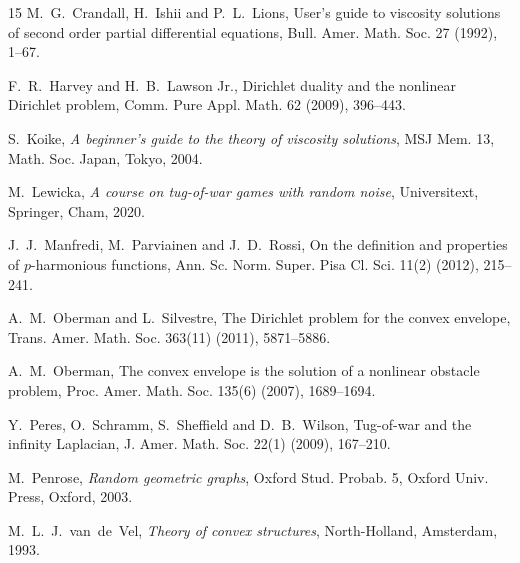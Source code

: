 \documentclass[11pt]{amsart}
\theoremstyle{definition}
\theoremstyle{remark}
\numberwithin{equation}{section}
\begin{document}
\begin{thebibliography}{15}
M.~G.~Crandall, H.~Ishii and P.~L.~Lions,
User's guide to viscosity solutions of second order partial differential equations,
Bull. Amer. Math. Soc. 27 (1992), 1--67.

F.~R.~Harvey and H.~B.~Lawson Jr.,
Dirichlet duality and the nonlinear Dirichlet problem,
Comm. Pure Appl. Math. 62 (2009), 396--443.
		
S.~Koike,
\textit{A beginner's guide to the theory of viscosity solutions},
MSJ Mem. 13, Math. Soc. Japan, Tokyo, 2004.

M.~Lewicka,
\textit{A course on tug-of-war games with random noise},
Universitext, Springer, Cham, 2020.

J.~J.~Manfredi, M.~Parviainen and J.~D.~Rossi,
On the definition and properties of $p$-harmonious functions,
Ann. Sc. Norm. Super. Pisa Cl. Sci. 11(2) (2012), 215--241.

A.~M.~Oberman and L.~Silvestre,
The Dirichlet problem for the convex envelope,
Trans. Amer. Math. Soc. 363(11) (2011), 5871--5886.

A.~M.~Oberman,
The convex envelope is the solution of a nonlinear obstacle problem,
Proc. Amer. Math. Soc. 135(6) (2007), 1689--1694.

Y.~Peres, O.~Schramm, S.~Sheffield and D.~B.~Wilson,
Tug-of-war and the infinity Laplacian,
J. Amer. Math. Soc. 22(1) (2009), 167--210.

M.~Penrose,
\textit{Random geometric graphs},
Oxford Stud. Probab. 5, Oxford Univ. Press, Oxford, 2003.

M.~L.~J.~van~de~Vel,
\textit{Theory of convex structures},
North-Holland, Amsterdam, 1993.



\end{thebibliography}


%
\end{document}
